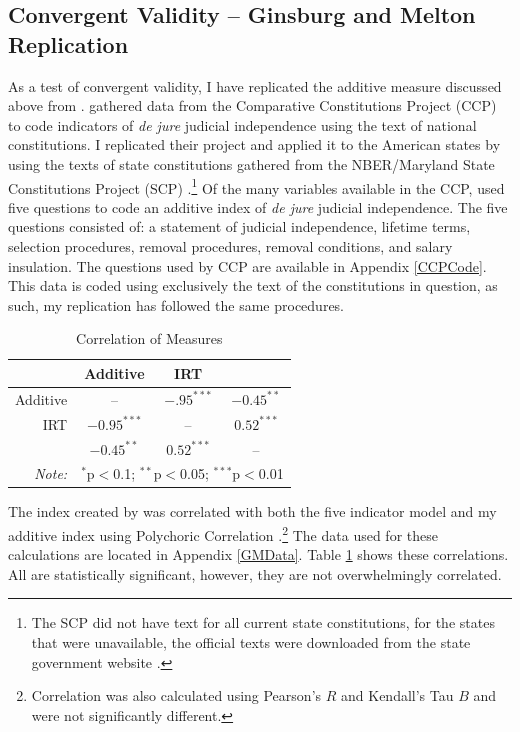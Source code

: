 \documentclass[12pt]{article}
\begin{document}
\subsection{Convergent Validity -- Ginsburg and Melton Replication}
As a test of convergent validity, I have replicated the additive measure discussed above from \citet{Melton2014}.  \citet{Melton2014} gathered data from the Comparative Constitutions Project (CCP) to code indicators of \textit{de jure} judicial independence using the text of national constitutions.  I replicated their project and applied it to the American states by using the texts of state constitutions gathered from the NBER/Maryland State Constitutions Project (SCP) \citep{Wallisnber}.\footnote{The SCP did not have text for all current state constitutions, for the states that were unavailable, the official texts were downloaded from the state government website \citep{Wallisnber}.}  Of the many variables available in the CCP, \citet{Melton2014} used five questions to code an additive index of \textit{de jure} judicial independence.  The five questions consisted of: a statement of judicial independence, lifetime terms, selection procedures, removal procedures, removal conditions, and salary insulation.  The questions used by CCP are available in Appendix \ref{CCPCode}.  This data is coded using exclusively the text of the constitutions in question, as such, my replication has followed the same procedures.

\begin{table}[ht]
	\centering\caption{Correlation of Measures}\label{Correlation}
	\begin{tabular}{rccc}
		\hline
		& Additive & IRT & \citeauthor{Melton2014} \\ 
		\hline
		Additive & -- & $-.95^{***}$ &$-0.45^{**}$ \\ 
		IRT & $-0.95^{***}$ & -- & $0.52^{***}$ \\ 
		\citeauthor{Melton2014} & $-0.45^{**}$  &  $0.52^{***}$ & --\\ 
		\hline
		\textit{Note:}  & \multicolumn{3}{l}{$^{*}$p$<$0.1; $^{**}$p$<$0.05; $^{***}$p$<$0.01} \\
	\end{tabular}
\end{table}

The index created by \citet{Melton2014} was correlated with both the five indicator model and my additive index using Polychoric Correlation \citep{Olsson1979}.\footnote{Correlation was also calculated using Pearson's $R$ and Kendall's Tau $B$ and were not significantly different.}  The data used for these calculations are located in Appendix \ref{GMData}.  Table \ref{Correlation} shows these correlations.  All are statistically significant, however, they are not overwhelmingly correlated.  
\end{document}
